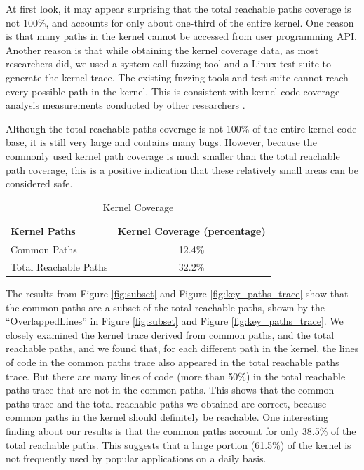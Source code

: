 At first look, it may appear surprising that the total reachable paths coverage is not 100\%, 
and accounts for only about one-third of the entire kernel. One reason is that many paths 
in the kernel cannot be accessed from user programming API. Another reason is that 
while obtaining the kernel coverage data, as most researchers did, we used a system call fuzzing tool 
and a Linux test suite to generate the kernel trace. The existing fuzzing tools and test suite 
cannot reach every possible path in the kernel. This is consistent with kernel code coverage analysis 
measurements conducted by other researchers \cite{LTP-Coverage}.

Although the total reachable paths coverage is not 100\% of the entire kernel code base, 
it is still very large and contains many bugs. 
However, because the commonly used kernel path coverage is much smaller than 
the total reachable path coverage, this is a positive indication that these relatively small areas can be considered safe.

\begin{table}
\centering
\scriptsize
\begin{tabular}{|l|c|}
  \hline
  \textbf{Kernel Paths} & \textbf{Kernel Coverage (percentage)} \\
  \hline \hline
  Common Paths & 12.4\% \\
  \hline
  Total Reachable Paths & 32.2\% \\
  \hline
\end{tabular}
\caption {Kernel Coverage}
\label{table:kernel_coverage}
\end{table}

The results from Figure \ref{fig:subset} and Figure \ref{fig:key_paths_trace} show that the common paths are a subset of the total reachable paths, 
shown by the ``OverlappedLines'' in Figure \ref{fig:subset} and Figure \ref{fig:key_paths_trace}. 
We closely examined the kernel trace derived from common paths, 
and the total reachable paths, and we found that, for each different path in the kernel, the lines of code 
in the common paths trace also appeared in the total reachable paths trace. But there are many lines of code (more than 50\%) 
in the total reachable paths trace that are not in the common paths. This shows that the common paths trace and 
the total reachable paths we obtained are correct, because common paths in the kernel should definitely be reachable. 
One interesting finding about our results is that the common paths account for only 38.5\% of the total reachable paths. 
This suggests that a large portion (61.5\%) of the kernel is not frequently used by popular applications on a daily basis.

